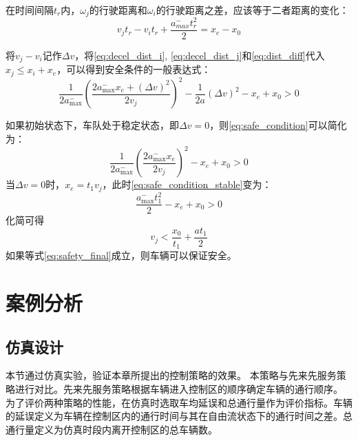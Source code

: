 在时间间隔$t_r$内，$\omega_j$的行驶距离和$\omega_i$的行驶距离之差，应该等于二者距离的变化：
\begin{equation}
    v_j t_r - v_i t_r + \frac{a_{max}^-t_r^2}{2} = x_e - x_0
    \label{eq:dist_diff}
\end{equation}

将$v_j-v_i$记作$\Delta v$，将\ref{eq:decel_dist_i}, \ref{eq:decel_dist_j}和\ref{eq:dist_diff}代入$x_j\leq x_i + x_e$，可以得到安全条件的一般表达式：
\begin{equation}
    \frac{1}{2 a_{\max }^{-}}\left(\frac{2 a_{\max }^{-} x_{e}+(\Delta v)^{2}}{2 v_{j}}\right)^{2}-\frac{1}{2 a}(\Delta v)^{2}-x_{e}+x_{0}>0
    \label{eq:safe_condition}
\end{equation}

如果初始状态下，车队处于稳定状态，即$\Delta v=0$，则\ref{eq:safe_condition}可以简化为：
\begin{equation}
    \frac{1}{2 a_{\max }^{-}}\left(\frac{2 a_{\max }^{-} x_{e}}{2 v_{j}}\right)^{2}-x_{e}+x_{0}>0
    \label{eq:safe_condition_stable}
\end{equation}
当$\Delta v=0$时，$x_e=t_1 v_j$，此时\ref{eq:safe_condition_stable}变为：
\begin{equation}
    \frac{a_{\max }^{-} t_{1}^{2}}{2}-x_{e}+x_{0}>0
    \label{eq:safe_condition_stable_xe}
\end{equation}
化简可得
\begin{equation}
    v_j < \frac{x_0}{t_1} + \frac{at_1}{2}
    \label{eq:safety_final}
\end{equation}
如果等式\ref{eq:safety_final}成立，则车辆可以保证安全。

\section{案例分析}


\subsection{仿真设计}
本节通过仿真实验，验证本章所提出的控制策略的效果。
本策略与先来先服务策略\cite{au2010motion}进行对比。先来先服务策略根据车辆进入控制区的顺序确定车辆的通行顺序。
为了评价两种策略的性能，在仿真时选取车均延误和总通行量作为评价指标。车辆的延误定义为车辆在控制区内的通行时间与其在自由流状态下的通行时间之差。总通行量定义为仿真时段内离开控制区的总车辆数。

